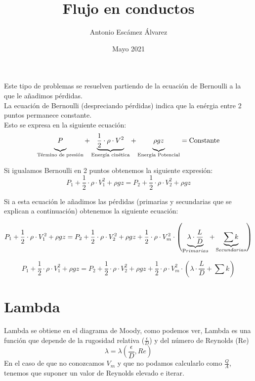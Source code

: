\documentclass[10pt,a4paper]{article}
\title{Flujo en conductos}
\author{Antonio Escámez Álvarez}
\date{Mayo 2021}
\begin{document}
\maketitle
\newpage
\tableofcontents
\newpage

Este tipo de problemas se resuelven partiendo de la ecuación de Bernoulli a la que le añadimos pérdidas.
\\

La ecuación de Bernoulli (despreciando pérdidas) indica que la enérgia entre 2 puntos permanece constante.
\\
Esto se expresa en la siguiente ecuación:
$$
\underbrace{\vphantom{\frac{}{}} P}_{\text{Término de presión}} + \underbrace{\frac{1}{2} \cdot \rho \cdot V^2}_{\text{Energía cinética}} + \underbrace{\vphantom{\frac{}{}}  \rho g z}_{\text{Energía Potencial}} = \text{Constante}
$$

Si igualamos Bernoulli en 2 puntos obtenemos la siguiente expresión:
$$
P_1 + \frac{1}{2} \cdot \rho \cdot V_{1}^2 + \rho g z = P_2 + \frac{1}{2} \cdot \rho \cdot V_{2}^2 + \rho g z 
$$

Si a esta ecuación le añadimos las pérdidas (primarias y secundarias que se explican a continuación) obtenemos la siguiente ecuación:

$$
P_1 + \frac{1}{2} \cdot \rho \cdot V_{1}^2 + \rho g z = P_2 + \frac{1}{2} \cdot \rho \cdot V_{2}^2 + \rho g z +  \frac{1}{2} \cdot \rho \cdot V_{m}^2 \cdot \left(\underbrace{\lambda \cdot \frac{L}{D}}_{\text Primarias} + \underbrace{\sum k}_{\text Secundarias} \right)
$$

\begin{center}
    \begin{tcolorbox}[colback=yellow!40!white, colframe=red!50!black,title=Ecuación de flujo en conductos]
    $$
        P_1 + \frac{1}{2} \cdot \rho \cdot V_{1}^2 + \rho g z = P_2 + \frac{1}{2} \cdot \rho \cdot V_{2}^2 + \rho g z +  \frac{1}{2} \cdot \rho \cdot V_{m}^2 \cdot \left(\lambda \cdot \frac{L}{D} + \sum k \right)
    $$
    \end{tcolorbox}
\end{center}

\newpage
\section{Lambda}
Lambda se obtiene en el diagrama de Moody, como podemos ver, Lambda es una función que depende de la rugosidad relativa ($\frac{\epsilon}{D}$) y del número de Reynolds (Re)
$$
\lambda = \lambda \left(\frac{\epsilon}{D},Re \right)
$$
En el caso de que no conozcamos $V_m$ y que no podamos calcularlo como $\frac{Q}{A}$, tenemos que suponer un valor de Reynolds elevado e iterar.
\\
\end{document}
